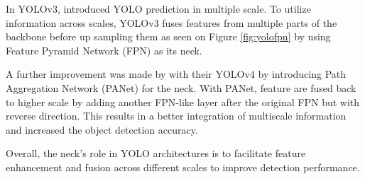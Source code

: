     In YOLOv3, \textcite{yolov3} introduced YOLO prediction in multiple scale.
    To utilize information across scales, YOLOv3 fuses features 
    from multiple parts of the backbone before up sampling them as seen on Figure \ref{fig:yolofpn} 
    by using Feature Pyramid Network (FPN) as its neck. 

    A further improvement was made by \textcite{yolov4} with their YOLOv4 by introducing Path 
    Aggregation Network (PANet) for the neck. 
    With PANet, feature are fused back to higher scale by adding another FPN-like layer after the original FPN
    but with reverse direction. This results in a better integration of multiscale information and increased the object detection accuracy.

    Overall, the neck's role in YOLO architectures is to facilitate feature enhancement and fusion across different scales to improve detection performance.
  
  
 

  
